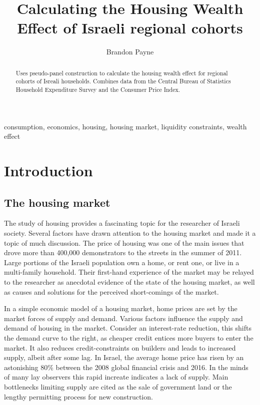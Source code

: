 \documentclass[12pt,a4paper,]{article}
\title{Calculating the Housing Wealth Effect of Israeli regional cohorts}
\author{Brandon Payne}
\date{}
\begin{document}
\maketitle

\begin{abstract}
Uses pseudo-panel construction to calculate the housing wealth effect for regional cohorts of Isreali households. Combines data from the Central Bureau of Statistics Household Expenditure Survey and the Consumer Price Index.
\end{abstract}

\begin{keywords}
 consumption, economics, housing, housing market, liquidity constraints, wealth effect 
\end{keywords}

\newpage

\section{Introduction}\label{introduction}

\subsection{The housing market}\label{the-housing-market}

The study of housing provides a fascinating topic for the researcher of
Israeli society. Several factors have drawn attention to the housing
market and made it a topic of much discussion. The price of housing was
one of the main issues that drove more than 400,000 demonstrators to the
streets in the summer of 2011. Large portions of the Israeli population
own a home, or rent one, or live in a multi-family household. Their
first-hand experience of the market may be relayed to the researcher as
anecdotal evidence of the state of the housing market, as well as causes
and solutions for the perceived short-comings of the market.

In a simple economic model of a housing market, home prices are set by
the market forces of supply and demand. Various factors influence the
supply and demand of housing in the market. Consider an interest-rate
reduction, this shifts the demand curve to the right, as cheaper credit
entices more buyers to enter the market. It also reduces
credit-constraints on builders and leads to increased supply, albeit
after some lag. In Israel, the average home price has risen by an
astonishing 80\% between the 2008 global financial crisis and 2016. In
the minds of many lay observers this rapid increate indicates a lack of
supply. Main bottlenecks limiting supply are cited as the sale of
government land or the lengthy permitting process for new construction.
\end{document}

